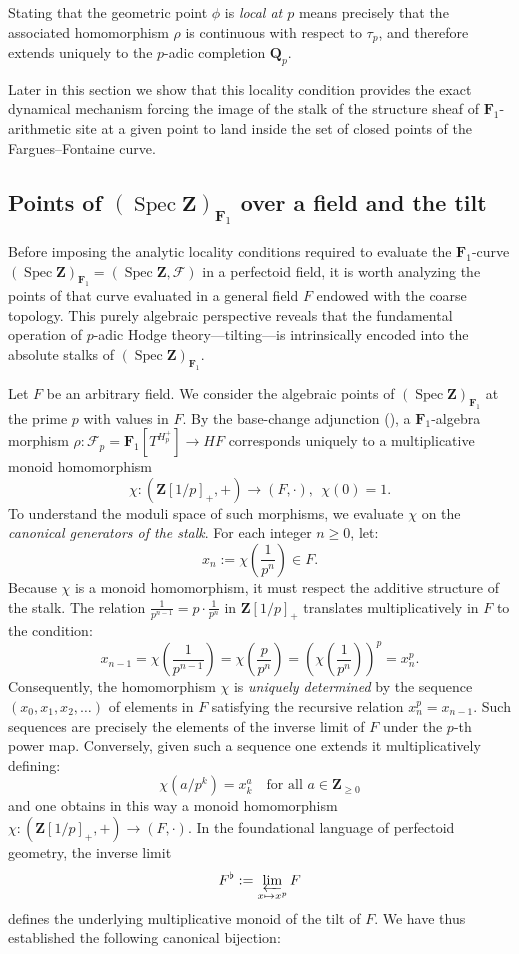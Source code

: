 \documentclass[11pt,a4paper]{article}
\newcommand{\Q}{\mathbf{Q}}
\newcommand{\Z}{\mathbf{Z}}
\newcommand{\Fone}{\mathbf{F}_{1}}
\def\spz{\Spec \Z}
\def\spzf{(\Spec \Z)_{\mathbf{F}_{1}}}
\newcommand{\Spec}{\operatorname{Spec}}
\begin{document}
Stating that the geometric point $\phi$ is 
\emph{local at $p$} means precisely that the associated 
homomorphism $\rho$ is continuous with respect 
to $\tau_p$, and therefore extends uniquely 
to the $p$-adic completion $\Q_p$.\vspace{.05in}

Later in this section we show that this locality condition provides the exact dynamical mechanism forcing the image of the stalk of the structure sheaf of $\Fone$-arithmetic site at a given point to land inside the set of closed points of the Fargues--Fontaine curve.

\subsection{Points of $\spzf$ over a field and the tilt}

Before imposing the analytic locality conditions required to evaluate the $\Fone$-curve \sloppy $\spzf=(\spz,\mathcal F)$ in a perfectoid field, it is worth  analyzing the points of that curve evaluated in a general field $F$ endowed with the coarse topology. This purely algebraic perspective reveals that the fundamental operation of $p$-adic Hodge theory---tilting---is intrinsically encoded into the absolute stalks of $\spzf$.\vspace{.03in}

Let $F$ be an arbitrary field. We consider the algebraic points of $\spzf$ at the prime $p$ with values in $F$. By the base-change adjunction (\cite[Proposition 2.2]{CC4}), a $\Fone$-algebra morphism 
$\rho: \mathcal F_p=\Fone[T^{H_p^+}] \to HF$ corresponds uniquely to a 
multiplicative monoid homomorphism 
\[
\chi : (\Z[1/p]_+, +) \longrightarrow (F, \cdot), \ \ \chi(0)=1.
\]
To understand the moduli space of such morphisms, we evaluate $\chi$ on the \emph{canonical generators of the stalk}. For each integer $n \ge 0$, let:
\[
x_n := \chi\left(\frac{1}{p^n}\right) \in F.
\]
Because $\chi$ is a monoid homomorphism, it must respect the additive structure of the stalk. The relation $\frac{1}{p^{n-1}} = p \cdot \frac{1}{p^n}$ in $\Z[1/p]_+$ translates multiplicatively in $F$ to the condition:
\[
x_{n-1} = \chi\left(\frac{1}{p^{n-1}}\right) = \chi\left(\frac{p}{p^n}\right) = \left( \chi\left(\frac{1}{p^n}\right) \right)^p = x_n^p.
\]
Consequently, the homomorphism $\chi$ is \emph{uniquely determined} by the sequence $(x_0, x_1, x_2, \dots)$ of elements in $F$ satisfying the recursive relation $x_n^p = x_{n-1}$. Such sequences are precisely the elements of the inverse limit of $F$ under the $p$-th power map. Conversely, given such a sequence one extends it multiplicatively defining:
\[
\chi(a/p^k)=x_k^a
\quad\text{for all } 
a\in\Z_{\ge0}
\] 
and one obtains in this way a  monoid homomorphism $\chi : (\Z[1/p]_+, +) \longrightarrow (F, \cdot)$.
 In the foundational language of perfectoid geometry, the inverse limit 
\[
F^\flat := \varprojlim_{ x \mapsto x^p} F
\]
defines the underlying multiplicative monoid of the tilt of $F$.
We have thus established the following canonical bijection:
\end{document}
